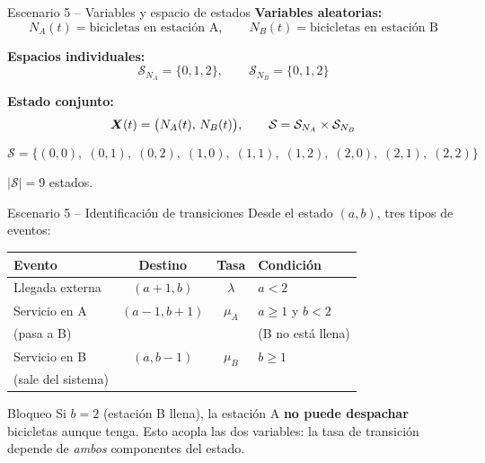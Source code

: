 \documentclass[aspectratio=1610, 9pt]{beamer}
\begin{document}
\begin{frame}{Escenario 5 -- Variables y espacio de estados}
\textbf{Variables aleatorias:}
\[
N_A(t) = \text{bicicletas en estaci\'on A}, \qquad N_B(t) = \text{bicicletas en estaci\'on B}
\]

\textbf{Espacios individuales:}
\[
\mathcal{S}_{N_A} = \{0, 1, 2\}, \qquad \mathcal{S}_{N_B} = \{0, 1, 2\}
\]

\textbf{Estado conjunto:}
\[
\boldsymbol{X}(t) = \big(N_A(t),\, N_B(t)\big), \qquad \mathcal{S} = \mathcal{S}_{N_A} \times \mathcal{S}_{N_B}
\]

\[
\mathcal{S} = \{(0,0),\;(0,1),\;(0,2),\;(1,0),\;(1,1),\;(1,2),\;(2,0),\;(2,1),\;(2,2)\}
\]

$|\mathcal{S}| = 9$ estados.
\end{frame}

\begin{frame}{Escenario 5 -- Identificaci\'on de transiciones}
Desde el estado $(a, b)$, tres tipos de eventos:

\vspace{3pt}
\renewcommand{\arraystretch}{1.3}
\footnotesize
\begin{tabular}{lccl}
\toprule
\textbf{Evento} & \textbf{Destino} & \textbf{Tasa} & \textbf{Condici\'on} \\
\midrule
Llegada externa & $(a{+}1, b)$ & $\lambda$ & $a < 2$ \\
\midrule
Servicio en A & $(a{-}1, b{+}1)$ & $\mu_A$ & $a \ge 1$ y $b < 2$ \\
(pasa a B) &&& (B no est\'a llena) \\
\midrule
Servicio en B & $(a, b{-}1)$ & $\mu_B$ & $b \ge 1$ \\
(sale del sistema) &&& \\
\bottomrule
\end{tabular}

\normalsize
\vspace{6pt}
\begin{alertblock}{Bloqueo}
Si $b = 2$ (estaci\'on B llena), la estaci\'on A \textbf{no puede despachar} bicicletas aunque tenga. Esto acopla las dos variables: la tasa de transici\'on depende de \textit{ambos} componentes del estado.
\end{alertblock}
\end{frame}
\end{document}
